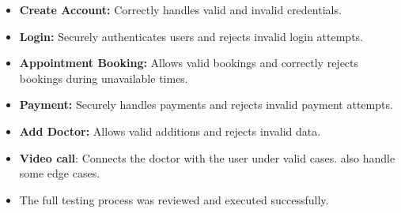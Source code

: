 \documentclass{article}
\begin{document}
\begin{itemize}
    \item \textbf{Create Account:} Correctly handles valid and invalid credentials.
    \item \textbf{Login:} Securely authenticates users and rejects invalid login attempts.
    \item \textbf{Appointment Booking:} Allows valid bookings and correctly rejects bookings during unavailable times.
    \item \textbf{Payment:} Securely handles payments and rejects invalid payment attempts.
    \item \textbf{Add Doctor:} Allows valid additions and rejects invalid data.
    \item \textbf{Video call}: Connects the doctor with the user under valid cases. also handle some edge cases.
    \item The full testing process was reviewed and executed successfully.
\end{itemize}
\end{document}
